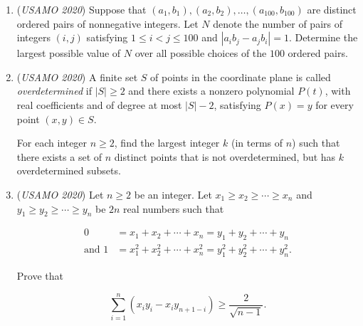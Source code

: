 \begin{enumerate}
 



 

	\item (\textit{USAMO 2020}) Suppose that $(a_1, b_1), (a_2, b_2), \ldots , (a_{100}, b_{100})$ are distinct ordered pairs of nonnegative integers. Let $N$ denote the number of pairs of integers $(i, j)$ satisfying $1 \le i < j \le 100$ and $|a_ib_j - a_j b_i|=1$. Determine the largest possible value of $N$ over all possible choices of the $100$ ordered pairs.


 



 

	\item (\textit{USAMO 2020}) A finite set $S$ of points in the coordinate plane is called \textit{overdetermined} if $|S| \ge 2$ and there exists a nonzero polynomial $P(t)$, with real coefficients and of degree at most $|S| - 2$, satisfying $P(x) = y$ for every point $(x, y) \in S$.


 For each integer $n \ge 2$, find the largest integer $k$ (in terms of $n$) such that there exists a set of $n$ distinct points that is not overdetermined, but has $k$ overdetermined subsets.


 

	\item (\textit{USAMO 2020}) Let $n \ge 2$ be an integer. Let $x_1 \ge x_2 \ge \cdots \ge x_n$ and $y_1 \ge y_2 \ge \cdots \ge y_n$ be $2n$ real numbers such that

 \begin{align*} 0 &= x_1 + x_2 + \cdots + x_n = y_1 + y_2 + \cdots + y_n\\ \text{and  }1 &= x_1^2+x_2^2+\cdots+x_n^2=y_1^2+y_2^2+\cdots+y_n^2. \end{align*}

Prove that

 \[\sum_{i=1}^n(x_iy_i-x_iy_{n+1-i})\ge\frac{2}{\sqrt{n-1}}.\]


\end{enumerate}